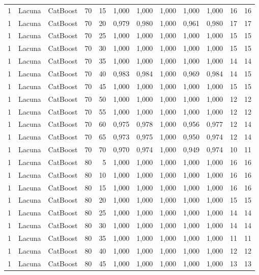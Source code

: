 \begin{longtable}{ccclrrrrrrrr}
1 & Lacuna & CatBoost & 70 & 15 & 1,000 & 1,000 & 1,000 & 1,000 & 1,000 & 16 & 16 \\
1 & Lacuna & CatBoost & 70 & 20 & 0,979 & 0,980 & 1,000 & 0,961 & 0,980 & 17 & 17 \\
1 & Lacuna & CatBoost & 70 & 25 & 1,000 & 1,000 & 1,000 & 1,000 & 1,000 & 15 & 15 \\
1 & Lacuna & CatBoost & 70 & 30 & 1,000 & 1,000 & 1,000 & 1,000 & 1,000 & 15 & 15 \\
1 & Lacuna & CatBoost & 70 & 35 & 1,000 & 1,000 & 1,000 & 1,000 & 1,000 & 14 & 14 \\
1 & Lacuna & CatBoost & 70 & 40 & 0,983 & 0,984 & 1,000 & 0,969 & 0,984 & 14 & 15 \\
1 & Lacuna & CatBoost & 70 & 45 & 1,000 & 1,000 & 1,000 & 1,000 & 1,000 & 15 & 15 \\
1 & Lacuna & CatBoost & 70 & 50 & 1,000 & 1,000 & 1,000 & 1,000 & 1,000 & 12 & 12 \\
1 & Lacuna & CatBoost & 70 & 55 & 1,000 & 1,000 & 1,000 & 1,000 & 1,000 & 12 & 12 \\
1 & Lacuna & CatBoost & 70 & 60 & 0,975 & 0,978 & 1,000 & 0,956 & 0,977 & 12 & 14 \\
1 & Lacuna & CatBoost & 70 & 65 & 0,973 & 0,975 & 1,000 & 0,950 & 0,974 & 12 & 14 \\
1 & Lacuna & CatBoost & 70 & 70 & 0,970 & 0,974 & 1,000 & 0,949 & 0,974 & 10 & 11 \\
1 & Lacuna & CatBoost & 80 & 5 & 1,000 & 1,000 & 1,000 & 1,000 & 1,000 & 16 & 16 \\
1 & Lacuna & CatBoost & 80 & 10 & 1,000 & 1,000 & 1,000 & 1,000 & 1,000 & 16 & 16 \\
1 & Lacuna & CatBoost & 80 & 15 & 1,000 & 1,000 & 1,000 & 1,000 & 1,000 & 16 & 16 \\
1 & Lacuna & CatBoost & 80 & 20 & 1,000 & 1,000 & 1,000 & 1,000 & 1,000 & 15 & 15 \\
1 & Lacuna & CatBoost & 80 & 25 & 1,000 & 1,000 & 1,000 & 1,000 & 1,000 & 14 & 14 \\
1 & Lacuna & CatBoost & 80 & 30 & 1,000 & 1,000 & 1,000 & 1,000 & 1,000 & 14 & 14 \\
1 & Lacuna & CatBoost & 80 & 35 & 1,000 & 1,000 & 1,000 & 1,000 & 1,000 & 11 & 11 \\
1 & Lacuna & CatBoost & 80 & 40 & 1,000 & 1,000 & 1,000 & 1,000 & 1,000 & 12 & 12 \\
1 & Lacuna & CatBoost & 80 & 45 & 1,000 & 1,000 & 1,000 & 1,000 & 1,000 & 13 & 13 \\

\end{longtable}

